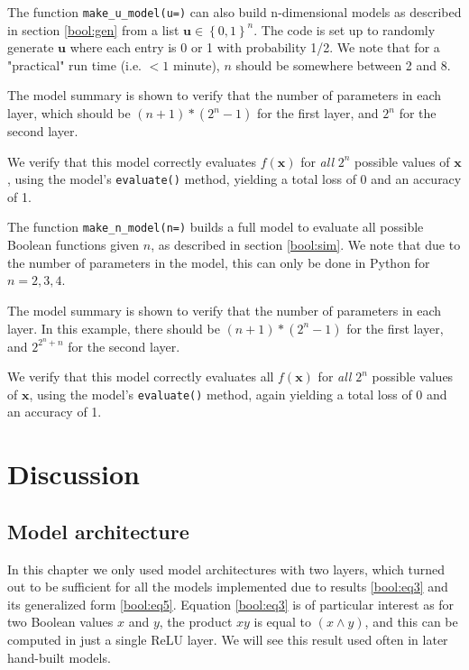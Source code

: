 \documentclass{somasmsc}
\begin{document}
\begin{exa}
The function \verb|make_u_model(u=)| can also build n-dimensional models as described in section \ref{bool:gen} from a list $\pmb{u} \in \left\{0, 1\right\}^n$. The code is set up to randomly generate $\pmb{u}$ where each entry is 0 or 1 with probability 1/2. We note that for a "practical" run time (i.e. $<1$ minute), $n$ should be somewhere between 2 and 8.

The model summary is shown to verify that the number of parameters in each layer, which should be $\left(n+1\right)*\left(2^n-1\right)$ for the first layer, and $2^n$ for the second layer.

We verify that this model correctly evaluates $f\left(\pmb{x}\right)$ for \textit{all} $2^n$ possible values of $\pmb{x}$, using the model's \verb|evaluate()| method, yielding a total loss of 0 and an accuracy of 1.
\end{exa}

\begin{exa}
The function \verb|make_n_model(n=)| builds a full model to evaluate all possible Boolean functions given $n$, as described in section \ref{bool:sim}. We note that due to the number of parameters in the model, this can only be done in Python for $n=2,3,4$.

The model summary is shown to verify that the number of parameters in each layer. In this example, there should be $\left(n+1\right)*\left(2^n-1\right)$ for the first layer, and $2^{2^n+n}$ for the second layer.

We verify that this model correctly evaluates all $f\left(\pmb{x}\right)$ for \textit{all} $2^n$ possible values of $\pmb{x}$, using the model's \verb|evaluate()| method, again yielding a total loss of 0 and an accuracy of 1.
\end{exa}

\section{Discussion}

\subsection{Model architecture}

In this chapter we only used model architectures with two layers, which turned out to be sufficient for all the models implemented due to results \ref{bool:eq3} and its generalized form \ref{bool:eq5}. Equation \ref{bool:eq3} is of particular interest as for two Boolean values $x$ and $y$, the product $xy$ is equal to $\left(x \land y\right)$, and this can be computed in just a single ReLU layer. We will see this result used often in later hand-built models.
\end{document}
